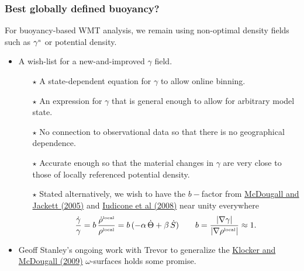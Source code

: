 \documentclass[10pt]{beamer}
\begin{document}
\begin{frame}
  \frametitle{Best globally defined buoyancy?}

  For buoyancy-based WMT analysis, we remain using non-optimal density
  fields such as $\gamma^{\mbox{\tiny n}}$ or potential density.

\begin{exampleblock}{}
\begin{itemize}

\item A wish-list for a new-and-improved $\gamma$ field.


\begin{itemize}  \footnotesize 
\item[$\star$] A state-dependent equation for $\gamma$ to allow online
  binning.

\item[$\star$] An expression for $\gamma$ that is general enough to
  allow for arbitrary model state.

\item[$\star$] No connection to observational data so that there is no
  geographical dependence.

\item[$\star$] Accurate enough so that the material changes in
  $\gamma$ are very close to those of locally referenced potential
  density. 

\item[$\star$] Stated alternatively, we wish to have the $b-$factor
  from \href{https://doi.org/10.1357/0022240053693734}{McDougall and
    Jackett (2005)} and
  \href{https://journals.ametsoc.org/doi/10.1175/2007JPO3464.1}{Iudicone
    et al (2008)} near unity everywhere
\begin{equation}
   \frac{\dot{\gamma}}{\gamma} = b \, \frac{\dot{\rho}^{\mbox{\tiny local}}}{\rho^{\mbox{\tiny local}} }
   = b \, (-\alpha \, \dot{\Theta} + \beta \, \dot{S})  
  \qquad b = \frac{ | \nabla \gamma| }{ | \nabla \rho^{\mbox{\tiny local}} | } 
  \approx 1.
\end{equation}

\end{itemize}

\item Geoff Stanley's ongoing work with Trevor to generalize the
  \href{https://www.ocean-sci.net/5/155/2009/}{Klocker and McDougall
    (2009)} $\omega$-surfaces holds some promise.

\end{itemize}
\end{exampleblock}{}

\end{frame}
\end{document}
